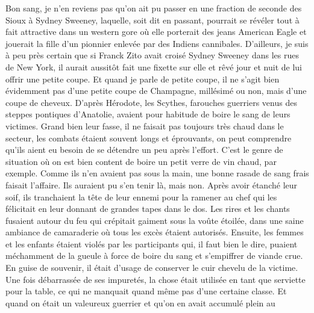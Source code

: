 
Bon sang, je n’en reviens pas qu’on ait pu passer en une fraction de seconde des Sioux à Sydney Sweeney, laquelle, soit dit en passant, pourrait se révéler tout à fait attractive dans un western gore où elle porterait des jeans American Eagle et jouerait la fille d’un pionnier enlevée par des Indiens cannibales. D’ailleurs, je suis à peu près certain que si Franck Zito avait croisé Sydney Sweeney dans les rues de New York, il aurait aussitôt fait une fixette sur elle et rêvé jour et nuit de lui offrir une petite coupe. Et quand je parle de petite coupe, il ne s’agit bien évidemment pas d’une petite coupe de Champagne, millésimé ou non, mais d’une coupe de cheveux. D’après Hérodote, les Scythes, farouches guerriers venus des steppes pontiques d’Anatolie, avaient pour habitude de boire le sang de leurs victimes. Grand bien leur fasse, il ne faisait pas toujours très chaud dans le secteur, les combats étaient souvent longs et éprouvants, on peut comprendre qu’ils aient eu besoin de se détendre un peu après l’effort. C’est le genre de situation où on est bien content de boire un petit verre de vin chaud, par exemple. Comme ils n’en avaient pas sous la main, une bonne rasade de sang frais faisait l’affaire. Ils auraient pu s’en tenir là, mais non. Après avoir étanché leur soif, ils tranchaient la tête de leur ennemi pour la ramener au chef qui les félicitait en leur donnant de grandes tapes dans le dos. Les rires et les chants fusaient autour du feu qui crépitait gaiment sous la voûte étoilée, dans une saine ambiance de camaraderie où tous les excès étaient autorisés. Ensuite, les femmes et les enfants étaient violés par les participants qui, il faut bien le dire, puaient méchamment de la gueule à force de boire du sang et s’empiffrer de viande crue. En guise de souvenir, il était d’usage de conserver le cuir chevelu de la victime. Une fois débarrassée de ses impuretés, la chose était utilisée en tant que serviette pour la table, ce qui ne manquait quand même pas d’une certaine classe. Et quand on était un valeureux guerrier et qu’on en avait accumulé plein au 